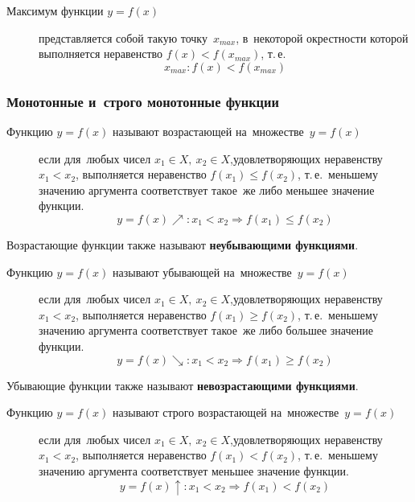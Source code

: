 \documentclass[]{scrartcl}
\begin{document}
\begin{description}
	\item[Максимум функции ${\textstyle y=f(x)}$] представляется собой такую точку~${\textstyle x_{max}}$, в~некоторой окрестности которой выполняется неравенство ${\textstyle f(x)<f(x_{max})}$, т.\,е.
	\begin{equation}\label{eq:function-13}
	x_{max}:f(x)<f(x_{max})
	\end{equation}
\end{description}

\subsubsection{Монотонные и~строго монотонные функции}
\begin{description}
	\item[Функцию ${\textstyle y=f(x)}$ называют возрастающей на~множестве~${\textstyle y=f(x)}$] если для~любых чисел ${\textstyle x_1 \in X,\ x_2 \in X}$,удовлетворяющих неравенству ${\textstyle x_1 < x_2}$, выполняется неравенство ${\textstyle f(x_1) \leq f(x_2)}$, т.\,е.~меньшему значению аргумента соответствует такое~же либо меньшее значение функции.
	\begin{equation}\label{eq:function-6}
	y=f(x)\nearrow :x_1 < x_2 \Rightarrow f(x_1) \leq f(x_2)
	\end{equation}
\end{description}
Возрастающие функции также называют \textbf{неубывающими функциями}.
\begin{description}
	\item[Функцию ${\textstyle y=f(x)}$ называют убывающей на~множестве~${\textstyle y=f(x)}$] если для~любых чисел ${\textstyle x_1 \in X,\ x_2 \in X}$,удовлетворяющих неравенству ${\textstyle x_1 < x_2}$, выполняется неравенство ${\textstyle f(x_1) \geq f(x_2)}$, т.\,е.~меньшему значению аргумента соответствует такое~же либо большее значение функции.
	\begin{equation}\label{eq:function-7}
	y=f(x)\searrow :x_1 < x_2 \Rightarrow f(x_1) \geq f(x_2)
	\end{equation}
\end{description}
Убывающие функции также называют \textbf{невозрастающими функциями}.
\begin{description}
	\item[Функцию ${\textstyle y=f(x)}$ называют строго возрастающей на~множестве~${\textstyle y=f(x)}$] если для~любых чисел ${\textstyle x_1 \in X,\ x_2 \in X}$,удовлетворяющих неравенству ${\textstyle x_1 < x_2}$, выполняется неравенство ${\textstyle f(x_1) < f(x_2)}$, т.\,е.~меньшему значению аргумента соответствует меньшее значение функции.
	\begin{equation}\label{eq:function-8}
	y=f(x)\uparrow :x_1 < x_2 \Rightarrow f(x_1) < f(x_2)
	\end{equation}
\end{description}
\end{document}
